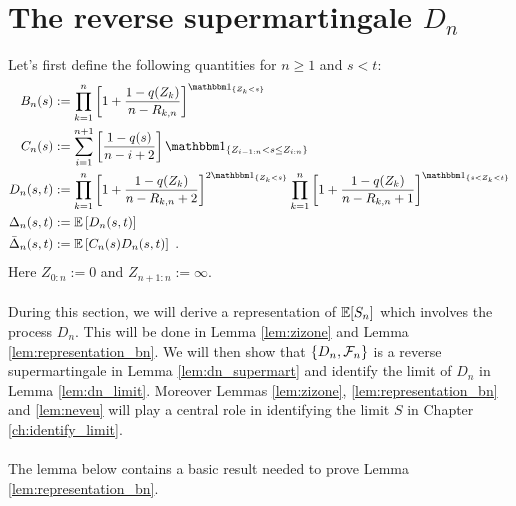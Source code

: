 \section{The reverse supermartingale $D_n$}
Let's first define the following quantities for $n\geq 1$ and $s < t$:
\begin{align*}
B_n(s) &:= \prod_{k=1}^{n}\left[1+\frac{1-q(Z_{k})}{n-R_{k,n}}\right]^{\I{Z_{k} < s}}\\
C_n(s) &:= \sum_{i=1}^{n+1}\left[\frac{1-q(s)}{n-i+2}\right]\I{Z_{i-1:n} < s \leq Z_{i:n}}\\
D_n(s,t) &:= \prod_{k=1}^{n} \left[1+\frac{1-q(Z_k)}{n-R_{k,n} +2}\right]^{2\I{Z_k<s}} \prod_{k=1}^{n}\left[1+\frac{1-q(Z_k)}{n-R_ {k,n}+1}\right]^{\I{s < Z_k < t}}\\
\Delta_n(s,t) &:= \E\left[D_n(s,t) \right]\\
\bar{\Delta}_n(s,t) &:= \E\left[C_n(s)D_n(s,t) \right]\mdot
\end{align*}
Here $Z_{0:n} := 0$ and $Z_{n+1:n} := \infty$.\\
\\
During this section, we will derive a representation of $\mathbb{E}[S_n]$ which involves the process $D_n$. This will be done in Lemma \ref{lem:zizone} and Lemma \ref{lem:representation_bn}. We will then show that $\{D_n,\mathcal{F}_n\}$ is a reverse supermartingale in Lemma \ref{lem:dn_supermart} and identify the limit of $D_n$ in Lemma \ref{lem:dn_limit}. Moreover Lemmas \ref{lem:zizone}, \ref{lem:representation_bn} and \ref{lem:neveu} will play a central role in identifying the limit $S$ in Chapter \ref{ch:identify_limit}.\\
\\
The lemma below contains a basic result needed to prove Lemma \ref{lem:representation_bn}.
